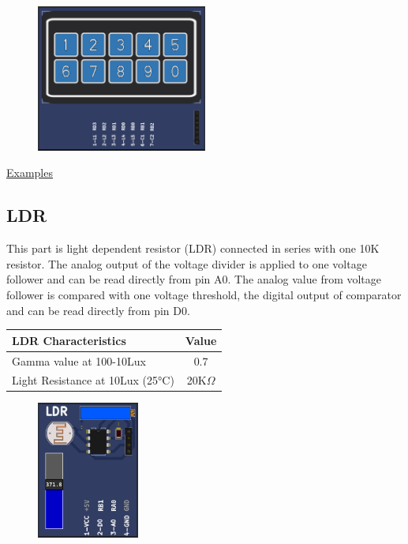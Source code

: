\begin{figure}[H]
\center
\includegraphics[width=0.5\textwidth]{img/part_keyb_2x5.png} 
\end{figure} 

\href{https://lcgamboa.github.io/picsimlab_examples/parts_Keypad.html}{Examples}


\subsection{LDR}

This part is light dependent resistor (LDR) connected in series with one 10K resistor.
The analog output of the voltage divider is applied to one voltage follower and can be 
read directly from pin A0.
The analog value from voltage follower is compared with one voltage threshold, the digital 
output of comparator and can be read directly from pin D0.

\begin{center}
\begin{tabular}{l|c}
\hline LDR Characteristics  & Value \\
\hline 
\hline Gamma value at 100-10Lux       &       0.7\\
\hline Light Resistance at 10Lux (25°C) &     20K$\Omega$\\
\hline 
\end{tabular}
\end{center}


\begin{figure}[H]
\center
\includegraphics[width=0.3\textwidth]{img/part_LDR.png} 
\end{figure} 

